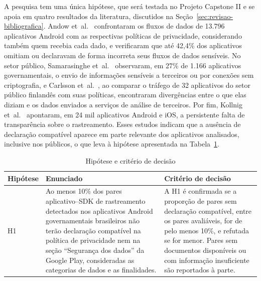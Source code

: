 \label{sec:1.5}

A pesquisa tem uma única hipótese, que será testada no Projeto Capstone II e se apoia em quatro resultados da literatura, discutidos na Seção~\ref{sec:revisao-bibliografica}. Andow et~al.~\cite{andow2020} confrontaram os fluxos de dados de 13.796 aplicativos Android com as respectivas políticas de privacidade, considerando também quem recebia cada dado, e verificaram que até 42,4\% dos aplicativos omitiam ou declaravam de forma incorreta seus fluxos de dados sensíveis. No setor público, Samarasinghe et~al.~\cite{samarasinghe2022} observaram, em 27\% de 1.166 aplicativos governamentais, o envio de informações sensíveis a terceiros ou por conexões sem criptografia, e Carlsson et~al.~\cite{carlsson2022}, ao comparar o tráfego de 32 aplicativos do setor público finlandês com suas políticas, encontraram divergências entre o que elas diziam e os dados enviados a serviços de análise de terceiros. Por fim, Kollnig et~al.~\cite{kollnig2022ios} apontaram, em 24 mil aplicativos Android e iOS, a persistente falta de transparência sobre o rastreamento. Esses estudos indicam que a ausência de declaração compatível aparece em parte relevante dos aplicativos analisados, inclusive nos públicos, o que leva à hipótese apresentada na Tabela~\ref{tab:hipotese}.

\begin{table}[htbp]
\centering
\small
\caption{Hipótese e critério de decisão}\label{tab:hipotese}
\begin{tabularx}{\textwidth}{|l|>{\raggedright\arraybackslash}X|>{\raggedright\arraybackslash}X|}
\hline
\textbf{Hipótese} & \textbf{Enunciado} & \textbf{Critério de decisão} \\
\hline
H1 & Ao menos 10\% dos pares aplicativo--SDK de rastreamento detectados nos aplicativos Android governamentais brasileiros não terão declaração compatível na política de privacidade nem na seção ``Segurança dos dados'' da Google Play, consideradas as categorias de dados e as finalidades. & A H1 é confirmada se a proporção de pares sem declaração compatível, entre os pares avaliáveis, for de pelo menos 10\%, e refutada se for menor. Pares sem documentos disponíveis ou com informação insuficiente são reportados à parte. \\ \hline
\end{tabularx}
\end{table}

